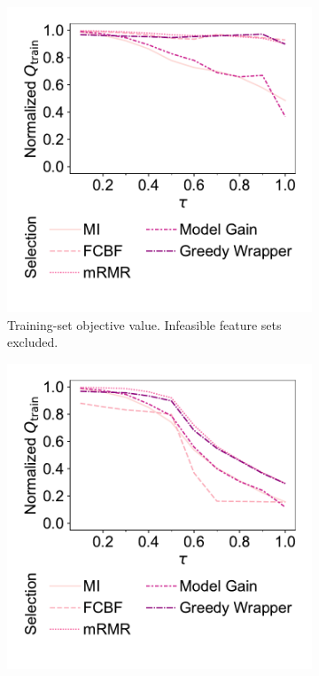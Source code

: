 \documentclass{article}
\theoremstyle{definition}
\begin{document}
\begin{figure}[p]
	\centering
	\begin{subfigure}[t]{0.48\textwidth}
		\centering
		\includegraphics[width=\textwidth, trim=20 40 15 15, clip]{plots/afs-impact-tau-fs-method-train-objective-max.pdf}
		\caption{
			Training-set objective value.
			Infeasible feature sets excluded.
		}
		\label{fig:afs:impact-tau-fs-method-train-objective-max}
	\end{subfigure}
	\hfill
	\begin{subfigure}[t]{0.48\textwidth}
		\centering
		\includegraphics[width=\textwidth, trim=20 40 15 15, clip]{plots/afs-impact-tau-fs-method-train-objective-max-fillna.pdf}

\end{subfigure}
\end{figure}
\end{document}
